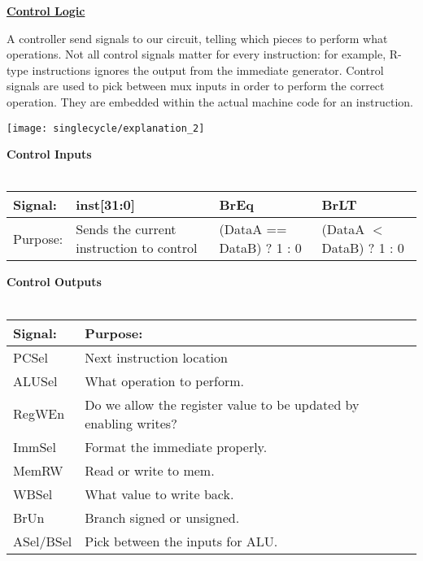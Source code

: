 \begin{blocksection}
\question

\textbf{\underline{Control Logic}}

A controller send signals to our circuit, telling which pieces to perform what operations.  Not all control signals matter for every instruction: for example, R-type instructions ignores the output from the immediate generator.  Control signals are used to pick between mux inputs in order to perform the correct operation.  They are embedded within the actual machine code for an instruction.

\texttt{[image: singlecycle/explanation\_2]}

\textbf{Control Inputs}\\\\
\begin{tabular}{ |l|l|l|l| } 
 \hline
 \textbf{Signal:} & \textbf{inst[31:0]} & \textbf{BrEq} & \textbf{BrLT} \\ 
 \hline
 Purpose: & Sends the current instruction to control & (DataA == DataB) ? 1 : 0 & (DataA $<$ DataB) ? 1 : 0 \\ 
 \hline
\end{tabular}

\textbf{Control Outputs}\\\\
\begin{tabular}{ |l|l|l|l|l| } 
 \hline
 \textbf{Signal:} & \textbf{Purpose:} \\
 \hline
 \hline
 PCSel & Next instruction location \\
 \hline
 ALUSel & What operation to perform. \\
 \hline
 RegWEn & Do we allow the register value to be updated by enabling writes? \\
 \hline
 ImmSel & Format the immediate properly.\\ 
 \hline
 MemRW & Read or write to mem. \\
 \hline
 WBSel & What value to write back. \\
 \hline 
 BrUn & Branch signed or unsigned. \\
 \hline 
 ASel/BSel & Pick between the inputs for ALU. \\
 \hline
\end{tabular}

\end{blocksection}